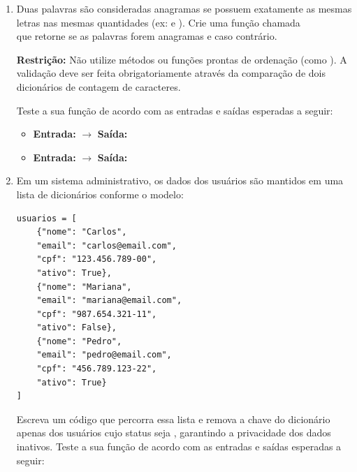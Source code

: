\begin{enumerate}[label=\textbf{Q\arabic*.}]
Teste a sua função de acordo com as entradas e saídas esperadas a seguir:

\begin{itemize}
    \item \textbf{Entrada:} A lista  fornecida.
    \item \textbf{Saída:} 
\end{itemize}




\item Duas palavras são consideradas anagramas se possuem exatamente as mesmas letras nas mesmas quantidades (ex:  e ). Crie uma função chamada \\ que retorne  se as palavras forem anagramas e  caso contrário.

\textbf{Restrição:} Não utilize métodos ou funções prontas de ordenação (como ). A validação deve ser feita obrigatoriamente através da comparação de dois dicionários de contagem de caracteres.

Teste a sua função de acordo com as entradas e saídas esperadas a seguir:

\begin{itemize}
    \item \textbf{Entrada:}  $\rightarrow$ \textbf{Saída:} 
    \item \textbf{Entrada:}  $\rightarrow$ \textbf{Saída:} 
\end{itemize}




\item Em um sistema administrativo, os dados dos usuários são mantidos em uma lista de dicionários conforme o modelo:
\begin{verbatim}
usuarios = [
    {"nome": "Carlos", 
    "email": "carlos@email.com", 
    "cpf": "123.456.789-00", 
    "ativo": True},
    {"nome": "Mariana", 
    "email": "mariana@email.com", 
    "cpf": "987.654.321-11", 
    "ativo": False},
    {"nome": "Pedro", 
    "email": "pedro@email.com", 
    "cpf": "456.789.123-22", 
    "ativo": True}
]
\end{verbatim}
Escreva um código que percorra essa lista e remova a chave  do dicionário apenas dos usuários cujo status  seja , garantindo a privacidade dos dados inativos.
Teste a sua função de acordo com as entradas e saídas esperadas a seguir:


\end{enumerate}
